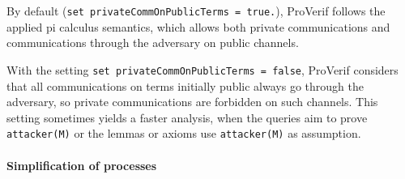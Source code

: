 \documentclass{book}
\begin{document}
\begin{itemize}
By default (\lstinline{set privateCommOnPublicTerms = true.}), ProVerif
follows the applied pi calculus semantics, which allows both
private communications and communications through the adversary
on public channels.

With the setting \lstinline{set privateCommOnPublicTerms = false},
ProVerif considers that all communications on terms initially public
always go through the adversary, so private communications
are forbidden on such channels. This setting sometimes yields
a faster analysis, when the queries aim to prove \lstinline!attacker(M)!
or the lemmas or axioms use \lstinline!attacker(M)! as assumption.

\end{itemize}

\paragraph{Simplification of processes}
\end{document}
